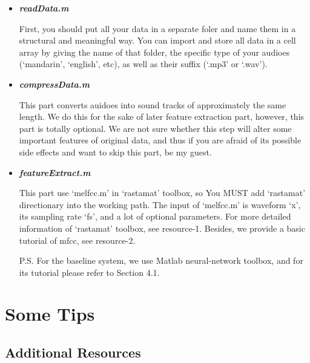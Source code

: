 \begin{itemize}
	\item \textbf{\emph{readData.m}}
	
	First, you should put all your data in a separate foler and name them in a structural and meaningful way. You can import and store all data in a cell array by giving the name of that folder, the specific type of your audioes (`mandarin', `english', etc), as well as their suffix (`.mp3' or `.wav'). 
	
	\item \textbf{\emph{compressData.m}}
	
	This part converts auidoes into sound tracks of approximately the same length. We do this for the sake of later feature extraction part, however, this part is totally optional. We are not sure whether this step will alter some important features of original data, and thus if you are afraid of its possible side effects and want to skip this part, be my guest.
	
	\item \textbf{\emph{featureExtract.m}}
	
	This part use `melfcc.m' in `rastamat' toolbox, so You MUST add `rastamat' directionary into the working path. The input of `melfcc.m' is waveform `x', its sampling rate `fs', and a lot of optional parameters. For more detailed information of `rastamat' toolbox, see resource-1. Besides, we provide a basic tutorial of mfcc, see resource-2.

	P.S. For the baseline system, we use Matlab neural-network toolbox, and for its tutorial please refer to Section 4.1.
	
	
	
\end{itemize}

\newpage

\section{Some Tips}
\subsection{Additional Resources}
